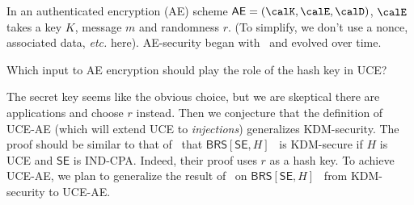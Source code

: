 {\begin{itemize}
\iffalse
In an authenticated encryption (AE) scheme $\mathsf{AE} = (\calK,\calE,\calD)$, $\calE$ takes a key $K$, message $m$ and randomness $r$. (To simplify, we don't use a  nonce,  associated data, \emph{etc.} here). AE-security began with~\cite{AC:BelNam00} and evolved over time.
\begin{ques}
    Which input to AE encryption should play the role of the hash key in UCE?
\end{ques}
The secret key seems like the obvious choice, but we are skeptical there are applications  and choose $r$ instead. Then we conjecture that the definition of UCE-AE (which will extend UCE to \emph{injections})  generalizes KDM-security.  The proof should be similar to that of~\cite{C:BelHoaKee13} that $\mathsf{BRS}[\mathsf{SE},H]$~\cite{C:BlaRogShr02} is KDM-secure if $H$ is UCE and $\mathsf{SE}$ is IND-CPA.  Indeed, their proof uses  $r$ as a hash key. To achieve UCE-AE, we plan to generalize the result of~\cite{C:BelHoaKee13} on  $\mathsf{BRS}[\mathsf{SE},H]$~\cite{C:BlaRogShr02} from KDM-security to UCE-AE.



\end{itemize}}

